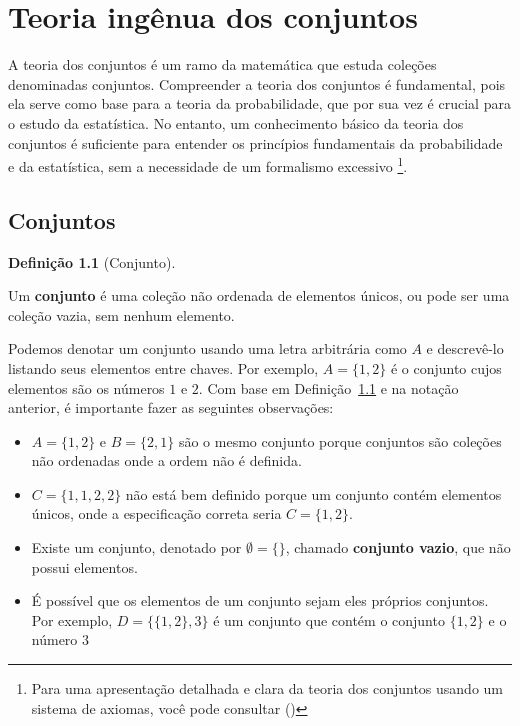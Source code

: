 \documentclass[
  letterpaper,
]{book}
\theoremstyle{plain}
\theoremstyle{definition}
\newtheorem{definition}{Definição}[chapter]
\theoremstyle{remark}
\begin{document}
\chapter{Teoria ingênua dos
conjuntos}\label{teoria-inguxeanua-dos-conjuntos}

A teoria dos conjuntos é um ramo da matemática que estuda coleções
denominadas conjuntos. Compreender a teoria dos conjuntos é fundamental,
pois ela serve como base para a teoria da probabilidade, que por sua vez
é crucial para o estudo da estatística. No entanto, um conhecimento
básico da teoria dos conjuntos é suficiente para entender os princípios
fundamentais da probabilidade e da estatística, sem a necessidade de um
formalismo excessivo \footnote{Para uma apresentação detalhada e clara
  da teoria dos conjuntos usando um sistema de axiomas, você pode
  consultar ()}.

\section{Conjuntos}\label{conjuntos}

\begin{definition}[Conjunto]\protect\hypertarget{def-set}{}\label{def-set}

Um \textbf{conjunto} é uma coleção não ordenada de elementos únicos, ou
pode ser uma coleção vazia, sem nenhum elemento.

\end{definition}

Podemos denotar um conjunto usando uma letra arbitrária como \(A\) e
descrevê-lo listando seus elementos entre chaves. Por exemplo,
\(A = \{ 1,2 \}\) é o conjunto cujos elementos são os números \(1\) e
\(2\). Com base em Definição~\ref{def-set} e na notação anterior, é
importante fazer as seguintes observações:

\begin{itemize}
\item
  \(A = \{ 1, 2 \}\) e \(B = \{ 2, 1 \}\) são o mesmo conjunto porque
  conjuntos são coleções não ordenadas onde a ordem não é definida.
\item
  \(C = \{ 1, 1, 2, 2 \}\) não está bem definido porque um conjunto
  contém elementos únicos, onde a especificação correta seria
  \(C = \{ 1, 2 \}\).
\item
  Existe um conjunto, denotado por \(\emptyset = \{ \}\), chamado
  \textbf{conjunto vazio}, que não possui elementos.
\item
  É possível que os elementos de um conjunto sejam eles próprios
  conjuntos. Por exemplo, \(D = \{ \{ 1, 2\}, 3 \}\) é um conjunto que
  contém o conjunto \(\{ 1, 2\}\) e o número \(3\)
\end{itemize}
\end{document}
